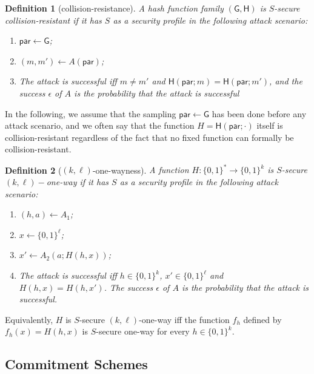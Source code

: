 \documentclass{article}
\newtheorem{definition}{Definition}[section]
\newcommand{\hfgen}[0]{\mathsf{G}} %
\newcommand{\hfunc}[0]{\mathsf{H}} %
\newcommand{\param}[0]{\mathsf{par}}
\begin{document}
\begin{definition}[collision-resistance]
A hash function family $(\hfgen,\hfunc)$ is $S$-secure collision-resistant if it has $S$ as a security profile in the following attack scenario:
\begin{enumerate}
\item $\param \gets \hfgen$;
\item $(m,m')\gets A(\param)$;
\item The attack is successful iff $m\neq m'$ and $\hfunc(\param;m)=\hfunc(\param;m')$,
and the success $\epsilon$ of $A$ is the probability that the attack is successful
\end{enumerate}
\end{definition}

\noindent In the following, we assume that the sampling $\param \gets \hfgen$ has been done before any attack scenario, and we often say that the function $H=\hfunc(\param; \cdot)$ itself is collision-resistant regardless of the fact that no fixed function can formally be collision-resistant.

\begin{definition}[$(k,\ell)$-one-wayness]
A function $H\colon \{0,1\}^\ast\rightarrow\{0,1\}^k$
is $S$-secure $(k,\ell)-$\emph{one-way} if it has $S$ as a security profile in the following attack scenario:
\begin{enumerate}
\item $(h,a)\gets A_1$;
\item $x \gets \{0,1\}^\ell$;
\item $x'\gets A_2(a;H(h,x))$;
\item The attack is successful iff $h\in\{0,1\}^k$, $x'\in\{0,1\}^\ell$ and $H(h,x)=H(h,x')$.
The success $\epsilon$ of $A$ is the probability that the attack is successful.
\end{enumerate}
\end{definition}

\noindent Equivalently, $H$ is $S$-secure $(k,\ell)$-one-way iff the function $f_h$ defined by $f_h(x)=H(h,x)$ is $S$-secure one-way for every $h\in\{0,1\}^k$.

\subsection{Commitment Schemes}
\end{document}
